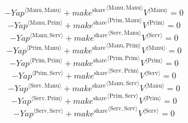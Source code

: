 \begin{equation}
-{{Y\!a\!p}}^{\langle \mathrm{Manu},\mathrm{Manu}\rangle} + {{{m\!a\!k\!e}^{\mathrm{share}}}^{\langle \mathrm{\mathrm{Manu}},\mathrm{\mathrm{Manu}}\rangle}} {{V}^{\langle \mathrm{Manu}\rangle}} = 0
\end{equation}
\begin{equation}
-{{Y\!a\!p}}^{\langle \mathrm{Manu},\mathrm{Prim}\rangle} + {{{m\!a\!k\!e}^{\mathrm{share}}}^{\langle \mathrm{\mathrm{Prim}},\mathrm{\mathrm{Manu}}\rangle}} {{V}^{\langle \mathrm{Prim}\rangle}} = 0
\end{equation}
\begin{equation}
-{{Y\!a\!p}}^{\langle \mathrm{Manu},\mathrm{Serv}\rangle} + {{{m\!a\!k\!e}^{\mathrm{share}}}^{\langle \mathrm{\mathrm{Serv}},\mathrm{\mathrm{Manu}}\rangle}} {{V}^{\langle \mathrm{Serv}\rangle}} = 0
\end{equation}
\begin{equation}
-{{Y\!a\!p}}^{\langle \mathrm{Prim},\mathrm{Manu}\rangle} + {{{m\!a\!k\!e}^{\mathrm{share}}}^{\langle \mathrm{\mathrm{Manu}},\mathrm{\mathrm{Prim}}\rangle}} {{V}^{\langle \mathrm{Manu}\rangle}} = 0
\end{equation}
\begin{equation}
-{{Y\!a\!p}}^{\langle \mathrm{Prim},\mathrm{Prim}\rangle} + {{{m\!a\!k\!e}^{\mathrm{share}}}^{\langle \mathrm{\mathrm{Prim}},\mathrm{\mathrm{Prim}}\rangle}} {{V}^{\langle \mathrm{Prim}\rangle}} = 0
\end{equation}
\begin{equation}
-{{Y\!a\!p}}^{\langle \mathrm{Prim},\mathrm{Serv}\rangle} + {{{m\!a\!k\!e}^{\mathrm{share}}}^{\langle \mathrm{\mathrm{Serv}},\mathrm{\mathrm{Prim}}\rangle}} {{V}^{\langle \mathrm{Serv}\rangle}} = 0
\end{equation}
\begin{equation}
-{{Y\!a\!p}}^{\langle \mathrm{Serv},\mathrm{Manu}\rangle} + {{{m\!a\!k\!e}^{\mathrm{share}}}^{\langle \mathrm{\mathrm{Manu}},\mathrm{\mathrm{Serv}}\rangle}} {{V}^{\langle \mathrm{Manu}\rangle}} = 0
\end{equation}
\begin{equation}
-{{Y\!a\!p}}^{\langle \mathrm{Serv},\mathrm{Prim}\rangle} + {{{m\!a\!k\!e}^{\mathrm{share}}}^{\langle \mathrm{\mathrm{Prim}},\mathrm{\mathrm{Serv}}\rangle}} {{V}^{\langle \mathrm{Prim}\rangle}} = 0
\end{equation}
\begin{equation}
-{{Y\!a\!p}}^{\langle \mathrm{Serv},\mathrm{Serv}\rangle} + {{{m\!a\!k\!e}^{\mathrm{share}}}^{\langle \mathrm{\mathrm{Serv}},\mathrm{\mathrm{Serv}}\rangle}} {{V}^{\langle \mathrm{Serv}\rangle}} = 0
\end{equation}
